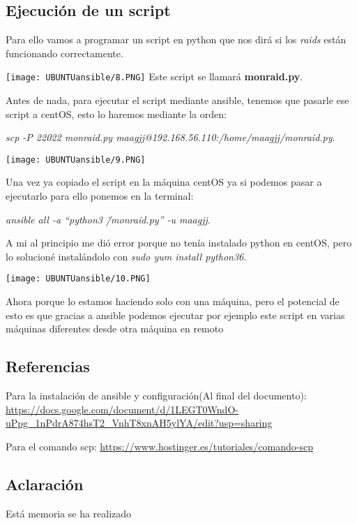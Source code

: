 \documentclass[a4paper, 12pt]{article}
\begin{document}
\subsection{Ejecución de un script}
\begin{justify}
{Para ello vamos a programar un script en python que nos dirá si los \textit{raids} están funcionando correctamente.}
\end{justify}
\texttt{[image: UBUNTUansible/8.PNG]}
{Este script se llamará \textbf{monraid.py}.}
\begin{justify}
{\par Antes de nada, para ejecutar el script mediante ansible, tenemos que pasarle ese script a centOS, esto lo haremos mediante la orden: 
\par \textit{scp -P 22022 monraid.py maagjj@192.168.56.110:/home/maagjj/monraid.py}.}
\end{justify}
\texttt{[image: UBUNTUansible/9.PNG]}
\begin{justify}
{\par Una vez ya copiado el script en la máquina centOS ya si podemos pasar a ejecutarlo para ello ponemos en la terminal:  
\par \textit{ansible all -a “python3 \~/monraid.py” -u maagjj}.}
{\par A mi al principio me dió error porque no tenía instalado python en 
centOS, pero lo solucioné instalándolo con \textit{sudo yum install python36}.}
\end{justify}
\texttt{[image: UBUNTUansible/10.PNG]}
\begin{justify}
{\par Ahora porque lo estamos haciendo solo con una máquina, pero el potencial de esto es que gracias a ansible podemos ejecutar por ejemplo este script en varias máquinas diferentes desde otra máquina en remoto}
\end{justify}
\subsection{Referencias}
{Para la instalación de ansible y configuración(Al final del documento):
\url{https://docs.google.com/document/d/1LEGT0WndO-uPpg_1nPdrA874hsT2_VnhT8xnAH5ylYA/edit?usp=sharing}}
{\par Para el comando scp:
\url{https://www.hostinger.es/tutoriales/comando-scp}}

\subsection*{Aclaración}
{\par Está memoria se ha realizado }
\end{document}
